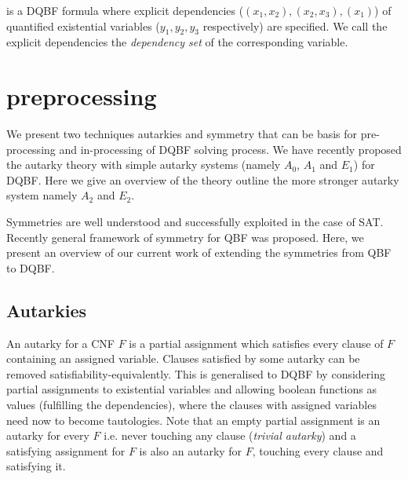 \documentclass[conference]{IEEEtran}
\begin{document}
is a DQBF formula where explicit dependencies ($(x_1,x_2), (x_2,x_3), (x_1)$) of quantified existential variables ($y_1, y_2, y_3$ respectively) are specified. We call the explicit dependencies the \textit{dependency set} of the corresponding variable. 
%

\section{preprocessing}
\label{sec:pre}

We present two techniques autarkies and symmetry that can be basis for pre-processing and in-processing of DQBF solving process. 
%
We have recently proposed the autarky theory with simple autarky systems (namely $A_0$, $A_1$ and $E_1$) for DQBF. 
%
Here we give an overview of the theory outline the more stronger autarky system
namely $A_2$ and $E_2$. 
%

Symmetries are well understood and successfully exploited in the case of SAT. 
%
Recently general framework of symmetry for QBF was proposed.
%
Here, we present an overview of our current work of extending the symmetries from QBF to DQBF.   

\subsection{Autarkies}
\label{sec:aut}
An autarky for a CNF $F$ is a partial assignment which satisfies every clause of $F$ containing an assigned variable. 
%
Clauses satisfied by some autarky can be removed satisfiability-equivalently. 
%
This is generalised to DQBF by considering partial assignments to existential variables and allowing boolean functions as values (fulfilling the dependencies), where the clauses with assigned variables need now to become tautologies.
%
Note that an empty partial assignment is an autarky for every $F$ i.e. never touching any clause (\textit{trivial autarky}) and a satisfying assignment for $F$ is also an autarky for $F$, touching every clause and satisfying it.
\end{document}
